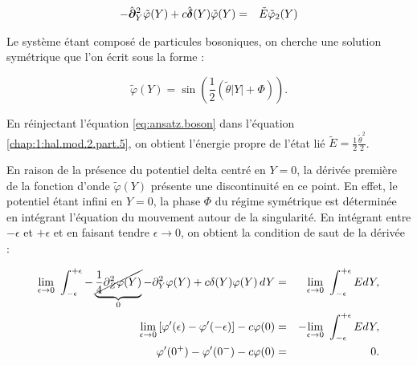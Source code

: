 \begin{eqnarray}\label{chap:1:hal.mod.2.part.5}
	- 	\hat{\bm{\partial}}_Y^2 \tilde{\varphi}(Y) + c \hat{\bm{\delta}} ( Y )\tilde{\varphi}(Y) & = & \tilde{E}\tilde{\varphi}_2(Y) 
\end{eqnarray}

Le système étant composé de particules bosoniques, on cherche une solution symétrique que l’on écrit sous la forme :


\begin{equation}
	\tilde{\varphi}(Y) = \sin\left( \frac{1}{2} (\tilde{\theta} |Y| + \Phi ) \right). \label{eq:ansatz.boson}
\end{equation}

En réinjectant l'équation \eqref{eq:ansatz.boson} dans l’équation \eqref{chap:1:hal.mod.2.part.5}, on obtient l’énergie propre de l’état lié $\tilde{E} = \frac{1}{2}\frac{\tilde{\theta}^2}{2}$.


En raison de la présence du potentiel delta centré en $Y = 0$, la dérivée première de la fonction d’onde $\tilde{\varphi}(Y)$ présente une discontinuité en ce point. En effet, le potentiel étant infini en $Y = 0$, la phase $\Phi$ du régime symétrique est déterminée en intégrant l’équation du mouvement autour de la singularité. En intégrant entre $- \epsilon$ et $+ \epsilon$ et en faisant tendre $\epsilon \to 0$, on obtient la condition de saut de la dérivée :





{\color{lightgray} 
\begin{eqnarray*}
	\underset{ \epsilon \to 0 }{\lim} \int_{-\epsilon}^{+\epsilon}  	-\underbrace{\cancel{\frac{1}{4} \partial_Z^2\varphi(Y)}}_{0} - 	\partial_Y^2\varphi(Y) + c \delta ( Y )\varphi(Y) \, dY  & = & \underset{ \epsilon \to 0 }{\lim}  \int_{-\epsilon}^{+\epsilon}  E d Y , \\
	\underset{ \epsilon \to 0 }{\lim}  \left [ \varphi'(\epsilon) - \varphi'(-\epsilon) \right ] - c \varphi (  0 ) & =  &  -\underset{ \epsilon \to 0 }{\lim}  \int_{-\epsilon}^{+\epsilon}  E d Y,\\
	 \varphi'(0^+) - \varphi'(0^-) - c \varphi (  0 ) & = & 0 .
\end{eqnarray*}


}

